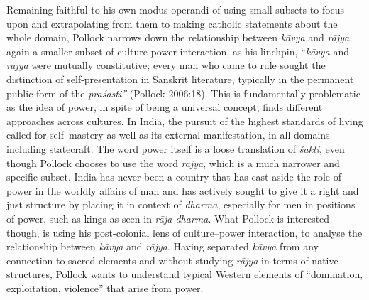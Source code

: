 Remaining faithful to his own modus operandi of using small subsets to focus upon and extrapolating from them to making catholic statements about the whole domain, Pollock narrows down the relationship between \textit{kāvya} and \textit{rājya}, again a smaller subset of culture-power interaction, as his linchpin, “\textit{kāvya} and \textit{rājya} were mutually constitutive; every man who came to rule sought the distinction of self-presentation in Sanskrit literature, typically in the permanent public form of the \textit{praśasti”} (Pollock 2006:18). This is fundamentally problematic as the idea of power, in spite of being a universal concept, finds different approaches across cultures. In India, the pursuit of the highest standards of living called for self–mastery as well as its external manifestation, in all domains including statecraft. The word power itself is a loose translation of \textit{śakti}, even though Pollock chooses to use the word \textit{rājya}, which is a much narrower and specific subset. India has never been a country that has cast aside the role of power in the worldly affairs of man and has actively sought to give it a right and just structure by placing it in context of \textit{dharma}, especially for men in positions of power, such as kings as seen in \textit{rāja-dharma}. What Pollock is interested though, is using his post-colonial lens of culture–power interaction, to analyse the relationship between \textit{kāvya} and \textit{rājya}. Having separated \textit{kāvya} from any connection to sacred elements and without studying \textit{rājya} in terms of native structures, Pollock wants to understand typical Western elements of “domination, exploitation, violence” that arise from power. 

